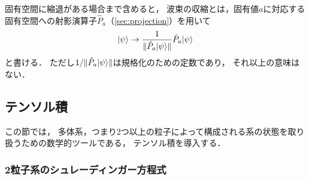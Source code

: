 \documentclass[
]{sotsu}
\begin{document}
固有空間に縮退がある場合まで含めると，
波束の収縮とは，固有値$a$に対応する固有空間への射影演算子$\hat{P}_{a}$（\cref{sec:projection}）を用いて
\begin{equation*}
    \ket{\psi} \to \frac{1}{\norm{\hat{P}_{a} \ket{\psi}}} \hat{P}_{a} \ket{\psi}
\end{equation*}
と書ける．
ただし\(
    1 / {\norm{\hat{P}_{a} \ket{\psi}}}
\)は規格化のための定数であり，
それ以上の意味はない．





\subsection{テンソル積}
\label{sec:tensor-product}

この節では，
多体系，つまり2つ以上の粒子によって構成される系の状態を取り扱うための数学的ツールである，
テンソル積を導入する．


\subsubsection{2粒子系のシュレーディンガー方程式}
\end{document}

